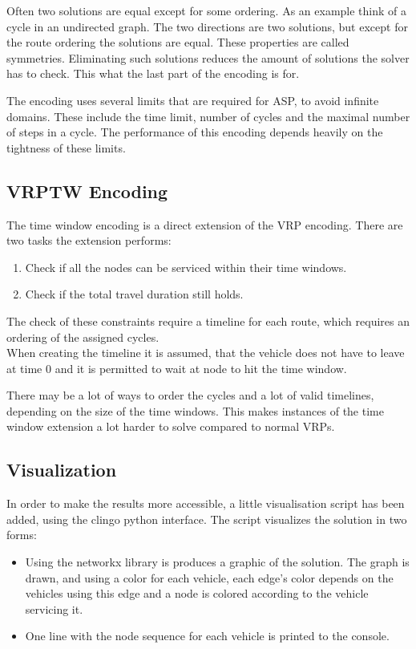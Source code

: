 \documentclass[12pt, letterpaper]{article}
\begin{document}
Often two solutions are equal except for some ordering. As an example think of a cycle in an undirected graph. The two directions are two solutions, but except for the route ordering the solutions are equal. These properties are called symmetries. Eliminating such solutions reduces the amount of solutions the solver has to check. This what the last part of the encoding is for.

The encoding uses several limits that are required for ASP, to avoid infinite domains. These include the time limit, number of cycles and the maximal number of steps in a cycle. The performance of this encoding depends heavily on the tightness of these limits.

\subsection{VRPTW Encoding}
The time window encoding is a direct extension of the VRP encoding. There are two tasks the extension performs:
\begin{enumerate}
	\item Check if all the nodes can be serviced within their time windows.
	\item Check if the total travel duration still holds.
\end{enumerate}

The check of these constraints require a timeline for each route, which requires an ordering of the assigned cycles. \\
When creating the timeline it is assumed, that the vehicle does not have to leave at time 0 and it is permitted to wait at node to hit the time window.

There may be a lot of ways to order the cycles and a lot of valid timelines, depending on the size of the time windows. This makes instances of the time window extension a lot harder to solve compared to normal VRPs.

\subsection{Visualization}
In order to make the results more accessible, a little visualisation script has been added, using the clingo python interface. The script visualizes the solution in two forms:
\begin{itemize}
	\item Using the networkx \cite{networkx} library is produces a graphic of the solution. The graph is drawn, and using a color for each vehicle, each edge's color depends on the vehicles using this edge and a node is colored according to the vehicle servicing it.
	\item One line with the node sequence for each vehicle is printed to the console.
\end{itemize}
\end{document}
